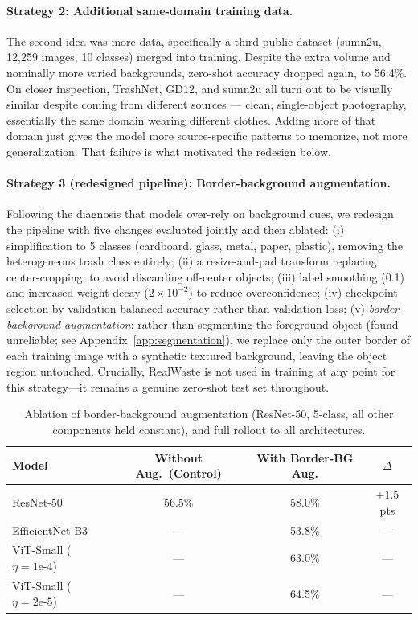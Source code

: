 \documentclass[a4paper]{article}
\begin{document}
\paragraph{Strategy 2: Additional same-domain training data.} The second idea was more data, specifically a third public dataset (sumn2u, 12{,}259 images, 10 classes) merged into training. Despite the extra volume and nominally more varied backgrounds, zero-shot accuracy dropped again, to 56.4\%. On closer inspection, TrashNet, GD12, and sumn2u all turn out to be visually similar despite coming from different sources --- clean, single-object photography, essentially the same domain wearing different clothes. Adding more of that domain just gives the model more source-specific patterns to memorize, not more generalization. That failure is what motivated the redesign below.

\paragraph{Strategy 3 (redesigned pipeline): Border-background augmentation.}
\label{sec:redesign}
Following the diagnosis that models over-rely on background cues, we redesign the pipeline with five changes evaluated jointly and then ablated: (i) simplification to 5 classes (cardboard, glass, metal, paper, plastic), removing the heterogeneous trash class entirely; (ii) a resize-and-pad transform replacing center-cropping, to avoid discarding off-center objects; (iii) label smoothing (0.1) and increased weight decay ($2\times10^{-2}$) to reduce overconfidence; (iv) checkpoint selection by validation balanced accuracy rather than validation loss; (v) \emph{border-background augmentation}: rather than segmenting the foreground object (found unreliable; see Appendix~\ref{app:segmentation}), we replace only the outer border of each training image with a synthetic textured background, leaving the object region untouched. Crucially, RealWaste is not used in training at any point for this strategy---it remains a genuine zero-shot test set throughout.

\begin{table}[t]
\caption{Ablation of border-background augmentation (ResNet-50, 5-class, all other components held constant), and full rollout to all architectures.}
\label{tab:ablation}
\centering
\begin{tabular}{lccc}
\toprule
Model & Without Aug.\ (Control) & With Border-BG Aug. & $\Delta$ \\
\midrule
ResNet-50 & 56.5\% & 58.0\% & +1.5 pts \\
EfficientNet-B3 & --- & 53.8\% & --- \\
ViT-Small ($\eta{=}1\text{e-}4$) & --- & 63.0\% & --- \\
ViT-Small ($\eta{=}2\text{e-}5$) & --- & 64.5\% & --- \\
\bottomrule
\end{tabular}
\end{table}
\end{document}
